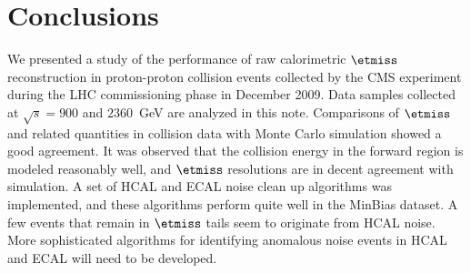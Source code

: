 \section{Conclusions}
We presented a study of the performance of raw calorimetric $\etmiss$
reconstruction in proton-proton collision events collected by the CMS
experiment during the LHC commissioning phase in December 2009. Data
samples collected at $\sqrt{s}=900$ and $2360$~GeV are analyzed in this
note. Comparisons of $\etmiss$ and related quantities in collision data
with Monte Carlo simulation showed a good agreement. It was observed
that the collision energy in the forward region is modeled
reasonably well, and $\etmiss$ resolutions are in decent agreement with
simulation. A set of HCAL and ECAL noise clean up algorithms was implemented, and
these algorithms perform quite well in the MinBias dataset. A few events that
remain in $\etmiss$ tails seem to originate from HCAL noise. More
sophisticated algorithms for identifying anomalous noise 
events in HCAL and ECAL will need to be developed.
